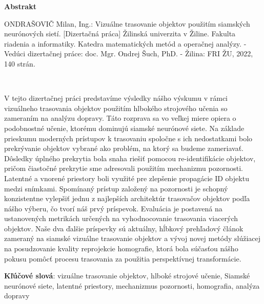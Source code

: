\thispagestyle{empty}

\begin{center}
    \Large{\textbf{Abstrakt}}
\end{center}

\noindent ONDRAŠOVIČ Milan, Ing.: Vizuálne trasovanie objektov použitím siamských neurónových sietí.
[Dizertačná práca] Žilinská univerzita v Žiline. Fakulta riadenia a informatiky. Katedra matematických metód a operačnej analýzy. - Vedúci dizertačnej práce: doc. Mgr. Ondrej Šuch, PhD. - Žilina: FRI ŽU, 2022, 140 strán.

\

\noindent V tejto dizertačnej práci predstavíme výsledky nášho výskumu v rámci vizuálneho trasovania objektov použitím hlbokého strojového učenia so zameraním na analýzu dopravy. Táto rozprava sa vo veľkej miere opiera o podobnostné učenie, ktorému dominujú siamské neurónové siete. Na základe prieskumu moderných prístupov k trasovaniu spoločne s ich nedostatkami bolo prekrývanie objektov vybrané ako problém, na ktorý sa budeme zameriavať. Dôsledky úplného prekrytia bola snaha riešiť pomocou re-identifikácie objektov, pričom čiastočné prekrytie sme adresovali použitím mechanizmu pozornosti. Latentné a vnorené priestory boli využité pre zlepšenie propagácie ID objektu medzi snímkami. Spomínaný prístup založený na pozornosti je schopný konzistentne vylepšiť jednu z najlepších architektúr trasovačov objektov podľa nášho výberu, čo tvorí náš prvý príspevok. Evaluácia je postavená na ustanovených metrikách určených na vyhodnocovanie trasovania viacerých objektov. Naše dva ďalšie príspevky sú aktuálny, hĺbkový prehľadový článok zameraný na siamské vizuálne trasovanie objektov a vývoj novej metódy slúžiacej na posudzovanie kvality reprojekcie homografie, ktorá bola súčasťou nášho pokusu pomôcť procesu trasovania za použitia perspektívnej transformácie.

\noindent \textbf{Kľúčové slová}: vizuálne trasovanie objektov, hlboké strojové učenie, Siamské neurónové siete, latentné priestory, mechanizmus pozornosti, homografia, analýza dopravy
